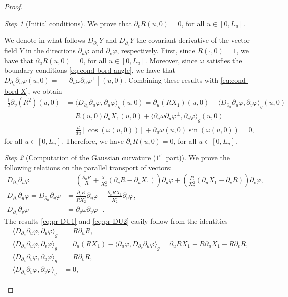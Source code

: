 \documentclass{article}
\newcommand{\DU}{\partial_{u}}
\newcommand{\DV}{\partial_{v}}
\theoremstyle{remark}
\theoremstyle{prpart}
\newtheorem{proofpart}{Step}
\newcommand{\PU}{\partial_{u}\varphi}
\newcommand{\PV}{\partial_{v}\varphi}
\begin{document}
\begin{proof}
\begin{proofpart}[Initial conditions]\label{step:bound-cond}
  We prove that $\partial_v R(u,0) = 0$, for all $u\in[0,L_u]$.

We denote in what follows $D_{\DU} Y$ and $D_{\DV} Y$ the covariant derivative of the vector field $Y$ in the directions $\PU$ and $\PV$, respectively. First, since $R(\cdot,0)=1$, we have that $\DU R(u,0) = 0$, for all $u\in[0,L_u]$. Moreover, since $\omega$ satisfies the boundary conditions \eqref{eq:cond-bord-angle}, we have that $D_{\DU}\PU(u,0) = -[\DU\omega\PU^{\perp}](u,0)$. Combining these results with \eqref{eq:cond-bord-X}, we obtain 
\begin{align*}
\frac{1}{2}\DV(R^2)(u,0) &= \big\langle D_{\DV}\PU,\PU\big\rangle_g(u,0) 
= \partial_u(RX_1)(u,0) - \big\langle D_{\DU}\PU,\PV\big\rangle_g(u,0)\\
&= R(u,0)\DU X_{1}(u,0) + \big\langle \DU\omega \PU^\perp,\PV\big\rangle_g(u,0) \\
&= \frac{d}{du} [\cos(\omega(u,0))] + \DU\omega(u,0) \sin(\omega(u,0))=0,
\end{align*}
for all $u\in[0,L_u]$. Therefore, we have $\partial_v R(u,0) = 0$, for all $u\in[0,L_u]$.
\end{proofpart}
\begin{proofpart}[Computation of the Gaussian curvature ($1^{\text{st}}$ part)]\label{step:gauss-curv1}
We prove the following relations on the parallel transport of vectors:
\begin{subequations}\label{eq:pr-DU-dum}
  \begin{align}\label{eq:pr-DU1}
D_{\partial_u}\PU &= \left(\frac{\DU R}{R}+\frac{X_1}{X_2^2}(\DV R-\DU X_1)\right)\PU+\left(\frac{R}{X_2^2}(\DU X_1-\DV R)\right)\PV,\\\label{eq:pr-DU2}
D_{\partial_v}\PU = D_{\partial_u}\PV &= \frac{\DV R}{RX_2^2}\PU - \frac{\DV RX_1}{X_2^2}\PV,\\\label{eq:pr-DV1}
D_{\partial_v}\PV &= \DV\omega\PV^\perp.
\end{align}
\end{subequations}
The results \eqref{eq:pr-DU1} and \eqref{eq:pr-DU2} easily follow from the identities
\begin{align*}
  \big\langle D_{\partial_u}\PU,\PU\big\rangle_g &= R\DU R,\\
\big\langle D_{\partial_u}\PU,\PV\big\rangle_g &= \partial_u(RX_1) - \big\langle\PU,D_{\partial_v}\PU\big\rangle_g = \DU RX_1+R\DU X_{1}-R\DV R,\\
\big\langle D_{\partial_u}\PV,\PU\big\rangle_g &= R\DV R,\\\big\langle D_{\partial_u}\PV,\PV\big\rangle_g &= 0,

\end{align*}
\end{proofpart}
\end{proof}
\end{document}
